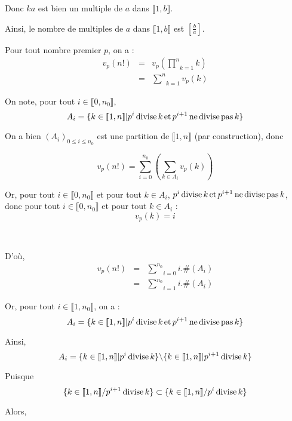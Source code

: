 Donc $k a$ est bien un multiple de $a$ dans $\llbracket 1, b \rrbracket$.

Ainsi, le nombre de multiples de $a$ dans $\llbracket 1, b \rrbracket$ est $
\left[ \frac{b}{a} \right]$.

Pour tout nombre premier $p$, on a :
\begin{eqnarray*}
  v_p (n!) & = & v_p \left( \underset{k = 1}{\overset{n}{\prod}} k \right)\\
  & = & \underset{k = 1}{\overset{n}{\sum}} v_p (k)
\end{eqnarray*}


On note, pour tout $i \in \llbracket 0, n_0 \rrbracket,$
\[ A_i = \{ k \in \llbracket 1, n \rrbracket  |  p^i \operatorname{divise}
   k \operatorname{et} p^{i + 1} \operatorname{ne} \operatorname{divise} \operatorname{pas} k \} \]


On a bien $(A_i)_{0 \leqslant i \leqslant n_0}$ est une partition de
$\llbracket 1, n \rrbracket$ (par construction), donc


\[ v_p (n!) = \underset{i = 0}{\overset{n_0}{\sum}} \left( \underset{k \in
   A_i}{\overset{}{\sum}} v_p (k) \right) \]


Or, pour tout $i \in \llbracket 0, n_0 \rrbracket$ et pour tout $k \in A_i$,
$p^i \operatorname{divise} k \operatorname{et} p^{i + 1} \operatorname{ne} \operatorname{divise} \operatorname{pas}
k$, donc pour tout $i \in \llbracket 0, n_0 \rrbracket$ et pour tout $k \in
A_i$ :
\[ v_p (k) = i \]


\

D'o{\`u},
\begin{eqnarray*}
  v_p (n!) & = & \underset{i = 0}{\overset{n_0}{\sum}} i.\# (A_i)\\
  & = & \underset{i = 1}{\overset{n_0}{\sum}} i.\# (A_i)
\end{eqnarray*}
\[ \  \]


Or, pour tout $i \in \llbracket 1, n_0 \rrbracket$, on a :
\[ A_i = \{ k \in \llbracket 1, n \rrbracket  |  p^i \operatorname{divise} k
   \operatorname{et} p^{i + 1} \operatorname{ne} \operatorname{divise} \operatorname{pas} k \} \]


Ainsi,
\[ A_i = \{ k \in \llbracket 1, n \rrbracket  |  p^i \operatorname{divise} k
   \} \backslash  \{ k \in \llbracket 1, n \rrbracket  | 
   p^{i + 1} \operatorname{divise} k \} \]


Puisque
\[ \{ k \in \llbracket 1, n \rrbracket / p^{i + 1} \operatorname{divise} k \} \subset
   \{ k \in \llbracket 1, n \rrbracket / p^i \operatorname{divise} k \} \]


Alors,


